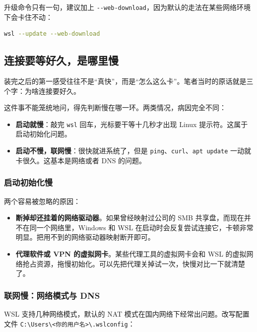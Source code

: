 \documentclass[12pt,a4paper]{ctexbook}
\begin{document}
升级命令只有一句，建议加上 \verb|--web-download|，因为默认的走法在某些网络环境下会卡住不动：

\begin{lstlisting}[language=bash,title={升级 WSL（在 PowerShell 中执行）}]
wsl --update --web-download
\end{lstlisting}

\subsection{连接要等好久，是哪里慢}

装完之后的第一感受往往不是``真快''，而是``怎么这么卡''。笔者当时的原话就是三个字：为啥连接要好久。

这件事不能笼统地问，得先判断慢在哪一环。两类情况，病因完全不同：

\begin{itemize}
    \item \textbf{启动就慢}：敲完 \verb|wsl| 回车，光标要干等十几秒才出现 Linux 提示符。这属于启动初始化问题。
    \item \textbf{启动不慢，联网慢}：很快就进系统了，但是 \verb|ping|、\verb|curl|、\verb|apt update| 一动就卡很久。这基本是网络或者 DNS 的问题。
\end{itemize}

\subsubsection{启动初始化慢}

两个容易被忽略的原因：

\begin{itemize}
    \item \textbf{断掉却还挂着的网络驱动器}。如果曾经映射过公司的 SMB 共享盘，而现在并不在同一个网络里，Windows 和 WSL 在启动时会反复尝试连接它，卡顿非常明显。把用不到的网络驱动器映射断开即可。
    \item \textbf{代理软件或 VPN 的虚拟网卡}。某些代理工具的虚拟网卡会和 WSL 的虚拟网络抢占资源，拖慢初始化。可以先把代理关掉试一次，快慢对比一下就清楚了。
\end{itemize}

\subsubsection{联网慢：网络模式与 DNS}

WSL 支持几种网络模式，默认的 NAT 模式在国内网络下经常出问题。改写配置文件 \texttt{C:\textbackslash Users\textbackslash <你的用户名>\textbackslash .wslconfig}：
\end{document}
